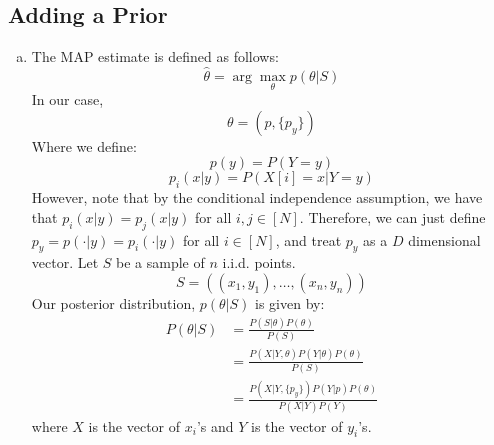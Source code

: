 \documentclass{amsart}
\theoremstyle{definition}
\begin{document}
\subsection{Adding a Prior}
\begin{enumerate}[(a)]
	\item 
		The MAP estimate is defined as follows:
		\[\hat{\theta} = \arg\max_\theta p(\theta |S)\]
		In our case, 
		\[\theta = (p, \{p_y\})\]
		Where we define:
		\[p(y) = P(Y = y)\]
		\[p_i(x|y) = P(X[i] = x| Y = y)\]
		However, note that by the conditional independence assumption, we have that $p_i(x|y) = p_j(x|y)$ for all $i, j \in [N]$.
		Therefore, we can just define $p_y = p(\cdot|y) = p_i(\cdot|y)$ for all $i \in [N]$, and treat $p_y$ as a $D$ dimensional vector.
		Let $S$ be a sample of $n$ i.i.d. points.
		\[S = ((x_1, y_1), \ldots, (x_n, y_n))\]
		Our posterior distribution, $p(\theta|S)$ is given by:
		\begin{align*}
			P(\theta|S) &= \frac{P(S|\theta) P(\theta)}{P(S)}\\
			&= \frac{P(X|Y,\theta) P(Y|\theta) P(\theta)}{P(S)}\\
			&= \frac{P(X|Y, \{p_y\})P(Y|p)P(\theta)}{P(X|Y)P(Y)}
		\end{align*}
		where $X$ is the vector of $x_i$'s and $Y$ is the vector of $y_i$'s.


\end{enumerate}
\end{document}
